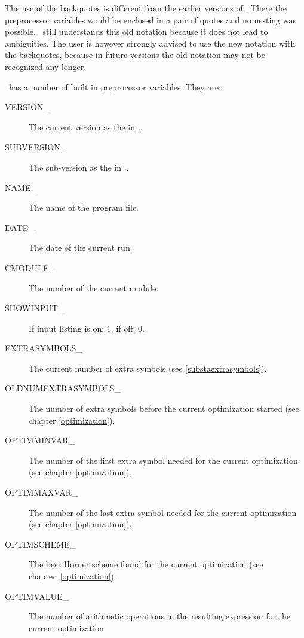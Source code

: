 The use of the backquotes is different from the earlier versions of \FORM\@. 
There the preprocessor variables would be enclosed in a pair of quotes and 
no nesting was possible. \FORM\ still understands this old 
notation because it does not lead to ambiguities. The user is however 
strongly advised to use the new notation with the backquotes, because in 
future versions the old notation may not be recognized 
any longer.

\noindent \FORM\ has a number of built in preprocessor variables. They are:

\begin{description}
\item[VERSION\_]  The current version as the \formmajorversion{} in 
                \formmajorversion.\formminorversion.
\item[SUBVERSION\_]  The sub-version as the \formminorversion{} in 
                \formmajorversion.\formminorversion.
\item[NAME\_]        The name of the program file.
\item[DATE\_]        The date of the current run.
\item[CMODULE\_]     The number of the current module.
\item[SHOWINPUT\_]   If input listing is on: 1, if off: 0.
\item[EXTRASYMBOLS\_]  The current number of extra symbols
       (see \ref{substaextrasymbols}).
\item[OLDNUMEXTRASYMBOLS\_]  The number of extra symbols
            before the current optimization started (see chapter \ref{optimization}).
\item[OPTIMMINVAR\_]  The number of the first extra symbol needed
               for the current optimization (see chapter \ref{optimization}).
\item[OPTIMMAXVAR\_]  The number of the last extra symbol needed
               for the current optimization (see chapter \ref{optimization}).
\item[OPTIMSCHEME\_]  The best Horner scheme found 
               for the current optimization (see chapter~\ref{optimization}).
\item[OPTIMVALUE\_]  The number of arithmetic operations 
               in the resulting expression for the current optimization 

\end{description}
